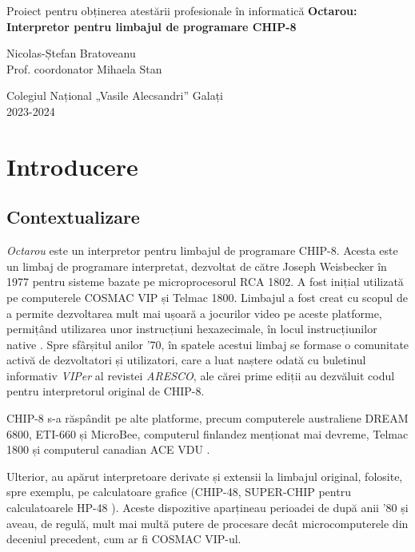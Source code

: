 \documentclass[a4paper]{article}
\begin{document}
\begin{titlepage}
	\begin{center}
		\Large Proiect pentru obținerea atestării profesionale în informatică
		\vfill
		\LARGE\textbf{Octarou: Interpretor pentru limbajul de programare CHIP-8}

		\vspace{8pt}
		\Large Nicolas-Ștefan Bratoveanu \\
		\large Prof. coordonator Mihaela Stan

		\vfill
		\Large
		Colegiul Național „Vasile Alecsandri” Galați \\
		2023-2024
	\end{center}
\end{titlepage}

\tableofcontents
\newpage

\section{Introducere}
\subsection{Contextualizare}
\textit{Octarou} este un interpretor pentru limbajul de programare CHIP-8. Acesta este un limbaj de programare interpretat, dezvoltat
de către Joseph Weisbecker în 1977 pentru sisteme bazate pe microprocesorul RCA 1802. A fost inițial utilizată pe computerele COSMAC VIP și Telmac
1800. Limbajul a fost creat cu scopul de a permite dezvoltarea mult mai ușoară a jocurilor video pe aceste platforme, permițând utilizarea unor
instrucțiuni hexazecimale, în locul instrucțiunilor native \cite{langhoff}. Spre sfârșitul anilor '70, în spatele acestui limbaj se formase o comunitate activă
de dezvoltatori și utilizatori, care a luat naștere odată cu buletinul informativ \textit{VIPer} al revistei \textit{ARESCO}, ale cărei prime
ediții au dezvăluit codul pentru interpretorul original de CHIP-8.

CHIP-8 s-a răspândit pe alte platforme, precum computerele australiene DREAM 6800, ETI-660 și MicroBee, computerul finlandez menționat mai devreme,
Telmac 1800 și computerul canadian ACE VDU \cite{langhoff}.

Ulterior, au apărut interpretoare derivate și extensii la limbajul original, folosite, spre exemplu, pe calculatoare grafice (CHIP-48, SUPER-CHIP
pentru calculatoarele HP-48 \cite{langhoff}). Aceste dispozitive aparțineau perioadei de după anii '80 și aveau, de regulă, mult mai multă putere de procesare
decât microcomputerele din deceniul precedent, cum ar fi COSMAC VIP-ul.
\end{document}
